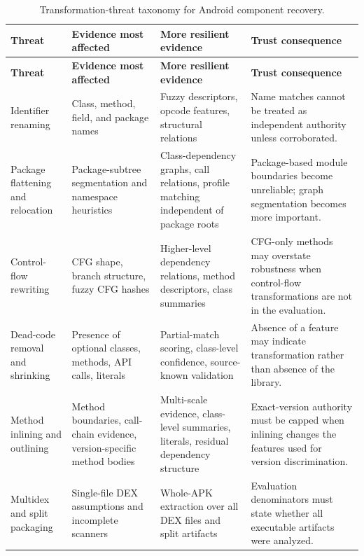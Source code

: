\begingroup
\small
\renewcommand{\arraystretch}{1.15}
\begin{longtable}{p{}p{}p{}p{}}
\caption{Transformation-threat taxonomy for Android component recovery.}
\label{tab:master-transformation-taxonomy}\\
\toprule
\textbf{Threat} & \textbf{Evidence most affected} & \textbf{More resilient evidence} & \textbf{Trust consequence}\\
\midrule
\endfirsthead
\toprule
\textbf{Threat} & \textbf{Evidence most affected} & \textbf{More resilient evidence} & \textbf{Trust consequence}\\
\midrule
\endhead
\bottomrule
\endfoot
Identifier renaming &
Class, method, field, and package names &
Fuzzy descriptors, opcode features, structural relations &
Name matches cannot be treated as independent authority unless corroborated.\\

Package flattening and relocation &
Package-subtree segmentation and namespace heuristics &
Class-dependency graphs, call relations, profile matching independent of
package roots &
Package-based module boundaries become unreliable; graph segmentation becomes
more important.\\

Control-flow rewriting &
CFG shape, branch structure, fuzzy CFG hashes &
Higher-level dependency relations, method descriptors, class summaries &
CFG-only methods may overstate robustness when control-flow transformations
are not in the evaluation.\\

Dead-code removal and shrinking &
Presence of optional classes, methods, API calls, literals &
Partial-match scoring, class-level confidence, source-known validation &
Absence of a feature may indicate transformation rather than absence of the
library.\\

Method inlining and outlining &
Method boundaries, call-chain evidence, version-specific method bodies &
Multi-scale evidence, class-level summaries, literals, residual dependency
structure &
Exact-version authority must be capped when inlining changes the features
used for version discrimination.\\

Multidex and split packaging &
Single-file DEX assumptions and incomplete scanners &
Whole-APK extraction over all DEX files and split artifacts &
Evaluation denominators must state whether all executable artifacts were
analyzed.\\


\end{longtable}
